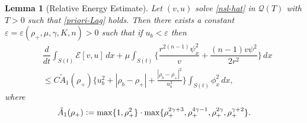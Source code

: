\documentclass[a4paper,12pt,draft]{article}
\newtheorem{lemma}[theorem]{Lemma}
\theoremstyle{remark}
\def\ep{\varepsilon}
\def\mE{\mathcal{E}}
\def\mQ{\mathcal{Q}}
\begin{document}
\begin{lemma}[Relative Energy Estimate] \label{lem:REE}
    Let $(v,u)$ solve \eqref{nsl-hat} in $\mQ(T)$ with $T>0$ such that \eqref{priori-Lag} holds. Then there exists a constant $\ep=\ep(\rho_+,\mu,\gamma,K,n)>0$ such that if $u_b< \ep$ then
	\begin{align*}
            &\dfrac{d}{d t}\!\int_{S(t)}\!\! \mE[v,u]\, d x + \mu\!\!\int_{S(t)}\!\! \Big\{ \dfrac{r^{2(n-1)}\psi_x^2}{v} + \dfrac{(n-1)v\psi^2}{2r^2}   \Big\}\, d x\\
            &\le C \tilde{A}_1(\rho_{+})\Big\{ u_b^2+|\rho_b-\rho_+| + \frac{|\rho_b-\rho_+|^2}{u_b^2} \Big\} \int_{S(t)}\!\!  \phi_x^2 \, d x,
	\end{align*}
	where
	\begin{equation*}
		\tilde{A}_1(\rho_{+}) \vcentcolon =\max\{1,\rho_{+}^2\} \cdot \max\{ \rho_+^{2\gamma+3}, \rho_{+}^{4\gamma-1}, \rho_{+}^{2\gamma}, \rho_{+}^{\gamma+2} \}.
	\end{equation*}
\end{lemma}
\end{document}
